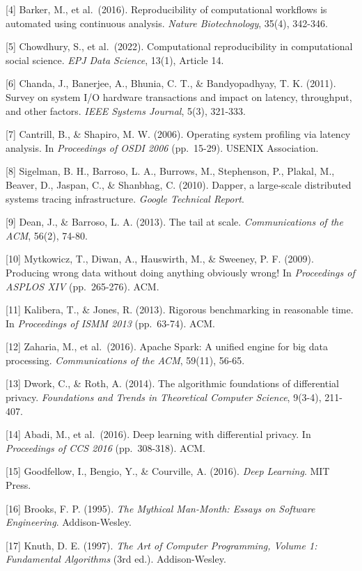 \documentclass[
]{article}
\begin{document}
{[}4{]} Barker, M., et al.~(2016). Reproducibility of computational
workflows is automated using continuous analysis. \emph{Nature
Biotechnology}, 35(4), 342-346.

{[}5{]} Chowdhury, S., et al.~(2022). Computational reproducibility in
computational social science. \emph{EPJ Data Science}, 13(1), Article
14.

{[}6{]} Chanda, J., Banerjee, A., Bhunia, C. T., \& Bandyopadhyay, T. K.
(2011). Survey on system I/O hardware transactions and impact on
latency, throughput, and other factors. \emph{IEEE Systems Journal},
5(3), 321-333.

{[}7{]} Cantrill, B., \& Shapiro, M. W. (2006). Operating system
profiling via latency analysis. In \emph{Proceedings of OSDI 2006}
(pp.~15-29). USENIX Association.

{[}8{]} Sigelman, B. H., Barroso, L. A., Burrows, M., Stephenson, P.,
Plakal, M., Beaver, D., Jaspan, C., \& Shanbhag, C. (2010). Dapper, a
large-scale distributed systems tracing infrastructure. \emph{Google
Technical Report}.

{[}9{]} Dean, J., \& Barroso, L. A. (2013). The tail at scale.
\emph{Communications of the ACM}, 56(2), 74-80.

{[}10{]} Mytkowicz, T., Diwan, A., Hauswirth, M., \& Sweeney, P. F.
(2009). Producing wrong data without doing anything obviously wrong! In
\emph{Proceedings of ASPLOS XIV} (pp.~265-276). ACM.

{[}11{]} Kalibera, T., \& Jones, R. (2013). Rigorous benchmarking in
reasonable time. In \emph{Proceedings of ISMM 2013} (pp.~63-74). ACM.

{[}12{]} Zaharia, M., et al.~(2016). Apache Spark: A unified engine for
big data processing. \emph{Communications of the ACM}, 59(11), 56-65.

{[}13{]} Dwork, C., \& Roth, A. (2014). The algorithmic foundations of
differential privacy. \emph{Foundations and Trends in Theoretical
Computer Science}, 9(3-4), 211-407.

{[}14{]} Abadi, M., et al.~(2016). Deep learning with differential
privacy. In \emph{Proceedings of CCS 2016} (pp.~308-318). ACM.

{[}15{]} Goodfellow, I., Bengio, Y., \& Courville, A. (2016). \emph{Deep
Learning}. MIT Press.

{[}16{]} Brooks, F. P. (1995). \emph{The Mythical Man-Month: Essays on
Software Engineering}. Addison-Wesley.

{[}17{]} Knuth, D. E. (1997). \emph{The Art of Computer Programming,
Volume 1: Fundamental Algorithms} (3rd ed.). Addison-Wesley.
\end{document}
